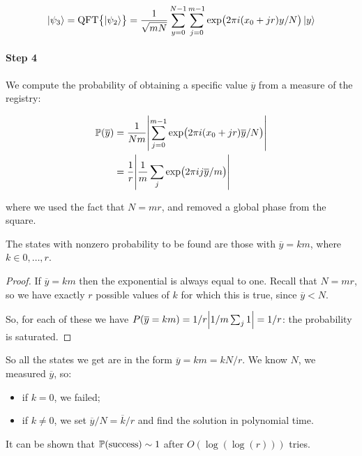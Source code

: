 \documentclass[main.tex]{subfiles}
\begin{document}
\begin{equation}
  \ket{\psi _3} = \text{QFT}\qty{\ket{\psi_2}} = \frac{1}{\sqrt{mN}} \sum _{y=0} ^{N-1} \sum _{j=0} ^{m-1} \exp(2 \pi i (x_0 + jr) y/N) \ket{y}
\end{equation}

\paragraph{Step 4}

We compute the probability of obtaining a specific value \(\overline{y} \) from a measure of the registry:

\begin{subequations}
\begin{align}
  \P\qty(\overline{y})
  &= \frac{1}{Nm} \abs{\sum _{j=0} ^{m-1} \exp(2 \pi i (x_0 + jr) \overline{y}/N) }  \\
  &= \frac{1}{r} \abs{\frac{1}{m} \sum_j \exp(2 \pi i j \overline{y} /m)}
\end{align}
\end{subequations}

where we used the fact that \(N = mr\), and removed a global phase from the square.

\begin{claim}
The states with nonzero probability to be found are those with \( \overline{y} = km \), where \( k \in 0, \dots,  r \).
\end{claim}

\begin{proof}
If \(\overline{y} = km \) then the exponential is always equal to one. Recall that \(N = mr\), so we have exactly \(r\) possible values of \(k\) for which this is true, since \(\overline{y} < N \).

So, for each of these we have \(P(\overline{y} = km) = 1/r \abs{1/m \sum_j 1} = 1/r \): the probability is saturated.
\end{proof}

So all the states we get are in the form \( \overline{y}=km = kN/r \). We know $N$, we measured \( \overline{y} \), so:

\begin{itemize}
  \item if \( k=0 \), we failed;
  \item if \( k\neq 0 \), we set \( \overline{y}/N = \overline{k}/r \) and find the solution in polynomial time.
\end{itemize}

It can be shown that \( \P(\text{success}) \sim 1 \) after \( O(\log(\log(r))) \) tries.
\end{document}
